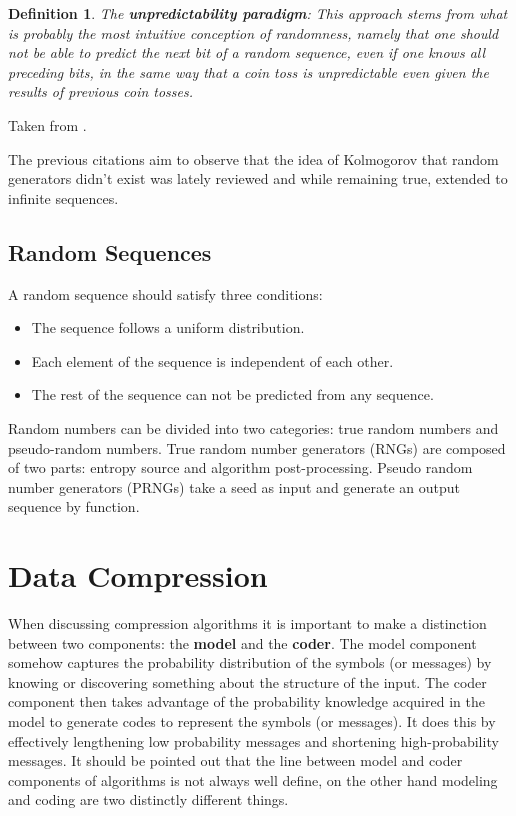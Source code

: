 \documentclass[12pt, a4paper]{report}
\newtheorem{definition}{Definition}[section] %
\begin{document}
\begin{definition}
The \textbf{unpredictability paradigm}: This approach stems from what is probably the most intuitive conception of randomness,
namely that one should not be able to predict the next bit of a random sequence, even if one knows all preceding bits, in the same
way that a coin toss is unpredictable even given the results of previous coin tosses.
\end{definition}

Taken from \cite{AlgorithmicRandomnessAndComplexity}.

The previous citations aim to observe that the idea of Kolmogorov that random generators didn't exist was lately reviewed and
while remaining true, extended to infinite sequences.

\section{Random Sequences}

A random sequence should satisfy three conditions:

\begin{itemize}
  \item The sequence follows a uniform distribution.
  \item Each element of the sequence is independent of each other.
  \item The rest of the sequence can not be predicted from any sequence.
\end{itemize}

Random numbers can be divided into two categories: true random numbers and pseudo-random numbers.
True random number generators (RNGs) are composed of two parts: entropy source and algorithm post-processing.
Pseudo random number generators (PRNGs) take a seed as input and generate an output sequence by function.

\chapter{Data Compression}

When discussing compression algorithms it is important to make a distinction between two components: the \textbf{model} and the
\textbf{coder}.
The model component somehow captures the probability distribution of the symbols (or messages) by knowing or discovering something
about the structure of the input.
The coder component then takes advantage of the probability knowledge acquired in the model to generate codes to represent the
symbols (or messages).
It does this by effectively lengthening low probability messages and shortening high-probability messages.
It should be pointed out that the line between model and coder components of algorithms is not always well define, on the other
hand modeling and coding are two distinctly different things.
\end{document}
